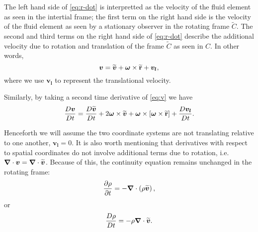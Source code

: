 The left hand side of \ref{eq:r-dot} is interpretted as the velocity
of the fluid element as seen in the intertial frame; the first term on the
right hand side is the velocity of the fluid element as seen by a
stationary observer in the rotating frame \(\widetilde{C}\).  The second
and third terms on the right hand side of \ref{eq:r-dot} describe the
additional velocity due to rotation and translation of the frame
\(\widetilde{C}\) as seen in \(C\).  In other words, 
  \begin{equation}\label{eq:v}
    \boldsymbol{v} = \widetilde{\boldsymbol{v}} + \boldsymbol{\omega}\times\widetilde{{\bf r}} + \boldsymbol{v_l},
  \end{equation}
where we use \(\boldsymbol{v_l}\) to represent the translational velocity.  

Similarly, by taking a second time derivative of \ref{eq:v} we have
  \begin{equation}\label{eq:a}
    \frac{D\boldsymbol{v}}{Dt} = \frac{D\widetilde{\boldsymbol{v}}}{Dt} + 2\boldsymbol{\omega}\times\widetilde{\boldsymbol{v}} + \boldsymbol{\omega}\times\left[\boldsymbol{\omega}\times\widetilde{{\bf r}}\right] + \frac{D\boldsymbol{v_l}}{Dt}.
  \end{equation}

Henceforth we will assume the two coordinate systems are not
translating relative to one another, \(\boldsymbol{v_l} = 0\).  It is
also worth mentioning that derivatives with respect to spatial
coordinates do not involve additional terms due to rotation,
i.e. \(\boldsymbol{\nabla}\cdot\boldsymbol{v} = \boldsymbol{\nabla}\cdot\widetilde{\boldsymbol{v}}\).
Because of this, the continuity equation remains unchanged in the
rotating frame:
  \begin{equation}\label{eq:cont-rot}
    \frac{\partial \rho}{\partial t} = -\boldsymbol{\nabla}\cdot\left(\rho\widetilde{\boldsymbol{v}}\right),
  \end{equation}
or 
  \begin{equation}\label{eq:cont-rot-total}
    \frac{D\rho}{Dt} = -\rho\boldsymbol{\nabla}\cdot\widetilde{\boldsymbol{v}}.
  \end{equation}

